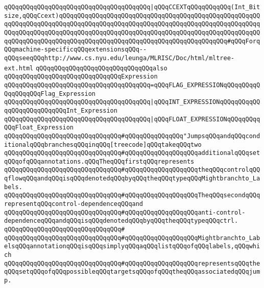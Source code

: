 \verb|qQQqqQQqqQQqqQQqqQQqqQQqqQQqqQQqqQQqqQQq|\verb#|qQQqCCEXTqQQqqQQqqQQq(Int_Bitsize,qQQqCcext)qQQqqQQqqQQqqQQqqQQqqQQqqQQqqQQqqQQqqQQqqQQqqQQqqQQqqQQqqQQqqQQqqQQqqQQqqQQqqQQqqQQqqQQqqQQqqQQqqQQqqQQqqQQqqQQqqQQqqQQqqQQqqQQqqQQqqQQqqQQqqQQqqQQqqQQqqQQqqQQqqQQqqQQqqQQqqQQqqQQqqQQqqQQqqQQqqQQqqQQqqQQqqQQqqQQqqQQqqQQqqQQqqQQqqQQqqQQqqQQqqQQqqQQqqQQqqQQq#\verb|#qQQqForqQQqmachine-specificqQQqextensionsqQQq--qQQqseeqQQqhttp://www.cs.nyu.edu/leunga/MLRISC/Doc/html/mltree-ext.html|\newline
\newline
\verb|qQQqqQQqqQQqqQQqqQQqqQQqqQQqqQQqalso|\newline
\verb|qQQqqQQqqQQqqQQqqQQqqQQqqQQqqQQqExpression|\newline
\verb|qQQqqQQqqQQqqQQqqQQqqQQqqQQqqQQqqQQqqQQq=qQQqFLAG_EXPRESSIONqQQqqQQqqQQqqQQqqQQqFlag_Expression|\newline
\verb|qQQqqQQqqQQqqQQqqQQqqQQqqQQqqQQqqQQqqQQq|\verb#|qQQqINT_EXPRESSIONqQQqqQQqqQQqqQQqqQQqqQQqqQQqInt_Expression#\newline
\verb|qQQqqQQqqQQqqQQqqQQqqQQqqQQqqQQqqQQqqQQq|\verb#|qQQqFLOAT_EXPRESSIONqQQqqQQqqQQqFloat_Expression#\newline
\newline
\verb|qQQqqQQqqQQqqQQqqQQqqQQqqQQqqQQq#qQQqqQQqqQQqqQQq"JumpsqQQqandqQQqconditionalqQQqbranchesqQQqinqQQq[treecode]qQQqtakeqQQqtwo|\newline
\verb|qQQqqQQqqQQqqQQqqQQqqQQqqQQqqQQq#qQQqqQQqqQQqqQQqqQQqadditionalqQQqsetqQQqofqQQqannotations.qQQqTheqQQqfirstqQQqrepresents|\newline
\verb|qQQqqQQqqQQqqQQqqQQqqQQqqQQqqQQq#qQQqqQQqqQQqqQQqqQQqtheqQQqcontrolqQQqflowqQQqandqQQqisqQQqdenotedqQQqbyqQQqtheqQQqtypeqQQqMightbranchto_Labels.|\newline
\verb|qQQqqQQqqQQqqQQqqQQqqQQqqQQqqQQq#qQQqqQQqqQQqqQQqqQQqTheqQQqsecondqQQqrepresentqQQqcontrol-dependenceqQQqand|\newline
\verb|qQQqqQQqqQQqqQQqqQQqqQQqqQQqqQQq#qQQqqQQqqQQqqQQqqQQqanti-control-dependenceqQQqandqQQqisqQQqdenotedqQQqbyqQQqtheqQQqtypeqQQqctrl.|\newline
\verb|qQQqqQQqqQQqqQQqqQQqqQQqqQQqqQQq#|\newline
\verb|qQQqqQQqqQQqqQQqqQQqqQQqqQQqqQQq#qQQqqQQqqQQqqQQqqQQqMightbranchto_LabelsqQQqannotationqQQqisqQQqsimplyqQQqaqQQqlistqQQqofqQQqlabels,qQQqwhich|\newline
\verb|qQQqqQQqqQQqqQQqqQQqqQQqqQQqqQQq#qQQqqQQqqQQqqQQqqQQqrepresentsqQQqtheqQQqsetqQQqofqQQqpossibleqQQqtargetsqQQqofqQQqtheqQQqassociatedqQQqjump.|\newline
